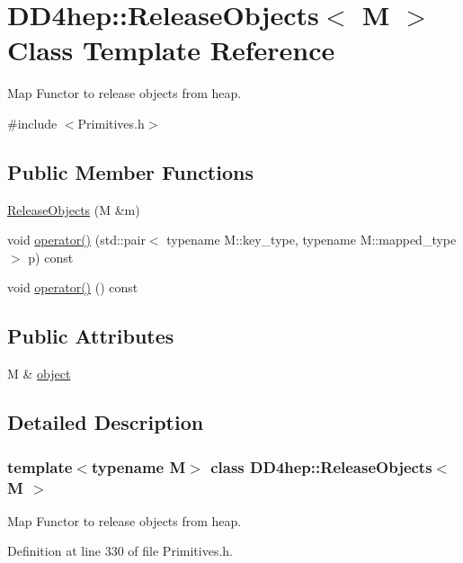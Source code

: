 \hypertarget{class_d_d4hep_1_1_release_objects}{
\section{DD4hep::ReleaseObjects$<$ M $>$ Class Template Reference}
\label{class_d_d4hep_1_1_release_objects}
}


Map Functor to release objects from heap.  


{\ttfamily \#include $<$Primitives.h$>$}\subsection*{Public Member Functions}
\begin{DoxyCompactItemize}
\item 
\hyperlink{class_d_d4hep_1_1_release_objects_ac8bed15483a32f35c3a157ff1a906080}{ReleaseObjects} (M \&m)
\item 
void \hyperlink{class_d_d4hep_1_1_release_objects_a2d689edda45dc3fc961818c874c53fdf}{operator()} (std::pair$<$ typename M::key\_\-type, typename M::mapped\_\-type $>$ p) const 
\item 
void \hyperlink{class_d_d4hep_1_1_release_objects_a4473253d578355e0ff3cffe217bde84b}{operator()} () const 
\end{DoxyCompactItemize}
\subsection*{Public Attributes}
\begin{DoxyCompactItemize}
\item 
M \& \hyperlink{class_d_d4hep_1_1_release_objects_a7f09cfa8646e892394904c47bb1faf98}{object}
\end{DoxyCompactItemize}


\subsection{Detailed Description}
\subsubsection*{template$<$typename M$>$ class DD4hep::ReleaseObjects$<$ M $>$}

Map Functor to release objects from heap. 

Definition at line 330 of file Primitives.h.

